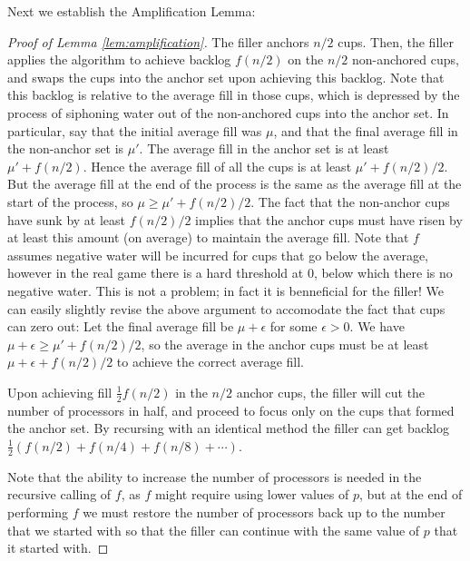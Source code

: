 \documentclass{article}[11pt]
\begin{document}
Next we establish the Amplification Lemma:
\begin{proof}[Proof of Lemma \ref{lem:amplification}]
  The filler anchors $n/2$ cups. Then, the filler applies the algorithm to
  achieve backlog $f(n/2)$ on the $n/2$ non-anchored cups, and swaps the cups
  into the anchor set upon achieving this backlog. Note that this backlog is
  relative to the average fill in those cups, which is depressed by the process
  of siphoning water out of the non-anchored cups into the anchor set. In
  particular, say that the initial average fill was $\mu$, and that the final
  average fill in the non-anchor set is $\mu'$. The average fill in the anchor
  set is at least $\mu' + f(n/2)$. Hence the average fill of all the cups is at
  least $\mu' + f(n/2)/2$. But the average fill at the end of the process is
  the same as the average fill at the start of the process, so $\mu \ge \mu' +
  f(n/2)/2$. The fact that the non-anchor cups have sunk by at least $f(n/2)/2$
  implies that the anchor cups must have risen by at least this amount (on
  average) to maintain the average fill. Note that $f$ assumes negative water
  will be incurred for cups that go below the average, however in the real game
  there is a hard threshold at $0$, below which there is no negative water.
  This is not a problem; in fact it is benneficial for the filler! We can
  easily slightly revise the above argument to accomodate the fact that cups
  can zero out: Let the final average fill be $\mu+\epsilon$ for some
  $\epsilon>0$. We have $\mu+\epsilon \ge \mu' + f(n/2)/2$, so the average in the
  anchor cups must be at least $\mu+\epsilon+f(n/2)/2$ to achieve the correct
  average fill.
  
  Upon achieving fill $\frac{1}{2}f(n/2)$ in the $n/2$ anchor cups, the filler
  will cut the number of processors in half, and proceed to focus only on the cups that 
  formed the anchor set. By recursing with an identical method the filler can
  get backlog $\frac{1}{2}(f(n/2) + f(n/4) + f(n/8) + \cdots)$.

  Note that the ability to increase the number of processors is needed in the
  recursive calling of $f$, as $f$ might require using lower values of $p$, but
  at the end of performing $f$ we must restore the number of processors back up
  to the number that we started with so that the filler can continue with the
  same value of $p$ that it started with.
\end{proof}
\end{document}
